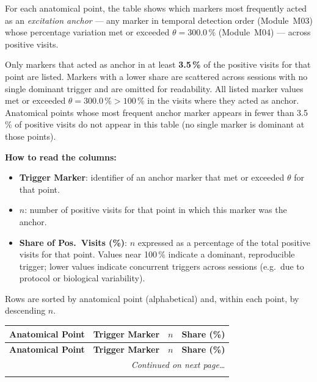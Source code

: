 \documentclass[a4paper,11pt]{article}
\begin{document}
For each anatomical point, the table shows which markers most frequently acted as an
\emph{excitation anchor} --- any marker in temporal detection order (Module~M03)
whose percentage variation met or exceeded $\theta = 300.0\,\%$
(Module~M04) --- across positive visits.

\medskip
Only markers that acted as anchor in at least \textbf{3.5\,\%}
of the positive visits for that point are listed.
Markers with a lower share are scattered across sessions with no single dominant trigger
and are omitted for readability.
All listed marker values met or exceeded $\theta = 300.0\,\% > 100\,\%$ in the
visits where they acted as anchor.
Anatomical points whose most frequent anchor marker appears in fewer than
3.5\,\% of positive visits do not appear in this table (no single
marker is dominant at those points).

\medskip
\noindent\textbf{How to read the columns:}
\begin{itemize}
  \item \textbf{Trigger Marker}: identifier of an anchor marker that met or exceeded $\theta$
        for that point.
  \item \textbf{$n$}: number of positive visits for that point in which this marker was
        the anchor.
  \item \textbf{Share of Pos.\ Visits (\%)}: $n$ expressed as a percentage of the total
        positive visits for that point.
        Values near 100\,\% indicate a dominant, reproducible trigger;
        lower values indicate concurrent triggers across sessions (e.g.\ due to
        protocol or biological variability).
\end{itemize}

\medskip
\noindent Rows are sorted by anatomical point (alphabetical) and, within each point, by
descending $n$.

\begin{footnotesize}
\begin{longtable}{p{3.5cm}p{7.5cm}rr}
\toprule
\textbf{Anatomical Point} &
\textbf{Trigger Marker} &
\textbf{$n$} &
\textbf{Share (\%)} \\
\midrule
\endfirsthead
\toprule
\textbf{Anatomical Point} &
\textbf{Trigger Marker} &
\textbf{$n$} &
\textbf{Share (\%)} \\
\midrule
\endhead
\midrule
\multicolumn{4}{r}{\footnotesize\emph{Continued on next page\ldots}} \\
\endfoot
\bottomrule
\endlastfoot

\end{longtable}
\end{footnotesize}
\end{document}
